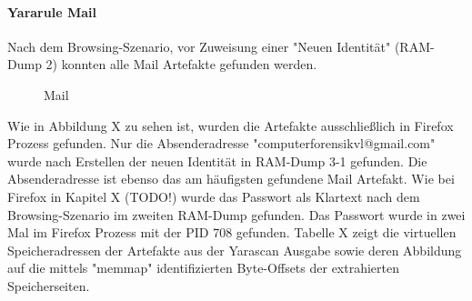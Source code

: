 \paragraph*{Yararule Mail}
Nach dem Browsing-Szenario, vor Zuweisung einer "Neuen Identität" (RAM-Dump 2) konnten alle Mail Artefakte gefunden werden.
\begin{figure}[h!]
	\centerline{}
	\label{chart:final-criteria}  
	\caption{Mail}
\end{figure}
Wie in Abbildung X zu sehen ist, wurden die Artefakte ausschließlich in Firefox Prozess gefunden.
Nur die Absenderadresse "computerforensikvl@gmail.com" wurde nach Erstellen der neuen Identität in RAM-Dump 3-1 gefunden. Die Absenderadresse ist ebenso das am häufigsten gefundene Mail Artefakt.
Wie bei Firefox in Kapitel X (TODO!) wurde das Passwort als Klartext nach dem Browsing-Szenario im zweiten RAM-Dump gefunden.
Das Passwort wurde in zwei Mal im Firefox Prozess mit der PID 708 gefunden. Tabelle X zeigt die virtuellen Speicheradressen der Artefakte aus der Yarascan Ausgabe sowie deren Abbildung auf die mittels "memmap" identifizierten Byte-Offsets der extrahierten Speicherseiten.
\begin{table}[]
\end{table}
